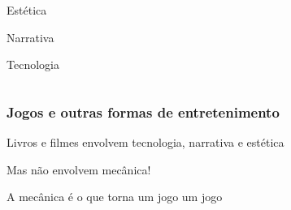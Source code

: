 \expandafter\documentclass\expandafter[table, usenames, svgnames, dvipsnames, \classopts]{beamer}
\begin{document}
\begin{frame}
\begin{columns}[c]
\begin{outline}
				\vspace{0.5em}

				\1 Estética
				
				\vspace{0.5em}
					
				\1 Narrativa

				\vspace{0.5em}

				\1 Tecnologia
			\end{outline}
		
	\end{columns}

\end{frame}

\begin{frame}
	\frametitle{\textbf{Jogos e outras formas de entretenimento}}

	\begin{outline}
		\1 Livros e filmes envolvem tecnologia, narrativa e estética
		
		\vspace{0.5em}
		
		\1 Mas não envolvem mecânica!
	\end{outline}

	\vspace{2em}

	\begin{block}{}
	
		\vspace{1em}
	
		\begin{center}
			{\Large A mecânica é o que torna um jogo um jogo}
		\end{center}

		\vspace{0.2em}

	\end{block}

\end{frame}
\end{document}
